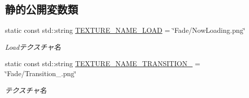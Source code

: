 \subsection*{静的公開変数類}
\begin{DoxyCompactItemize}
\item 
static const std\+::string \mbox{\hyperlink{class_fade_a7334ff03d82f19ab5129cb40351f9e77}{T\+E\+X\+T\+U\+R\+E\+\_\+\+N\+A\+M\+E\+\_\+\+L\+O\+AD}} = \char`\"{}Fade/Now\+Loading.\+png\char`\"{}
\begin{DoxyCompactList}\small\item\em Loadテクスチャ名 \end{DoxyCompactList}\item 
static const std\+::string \mbox{\hyperlink{class_fade_ab5d6f86f07e33205224fa486ff22c51d}{T\+E\+X\+T\+U\+R\+E\+\_\+\+N\+A\+M\+E\+\_\+\+T\+R\+A\+N\+S\+I\+T\+I\+O\+N\+\_}} = \char`\"{}Fade/Transition\+\_.\+png\char`\"{}
\begin{DoxyCompactList}\small\item\em テクスチャ名 \end{DoxyCompactList}\end{DoxyCompactItemize}
